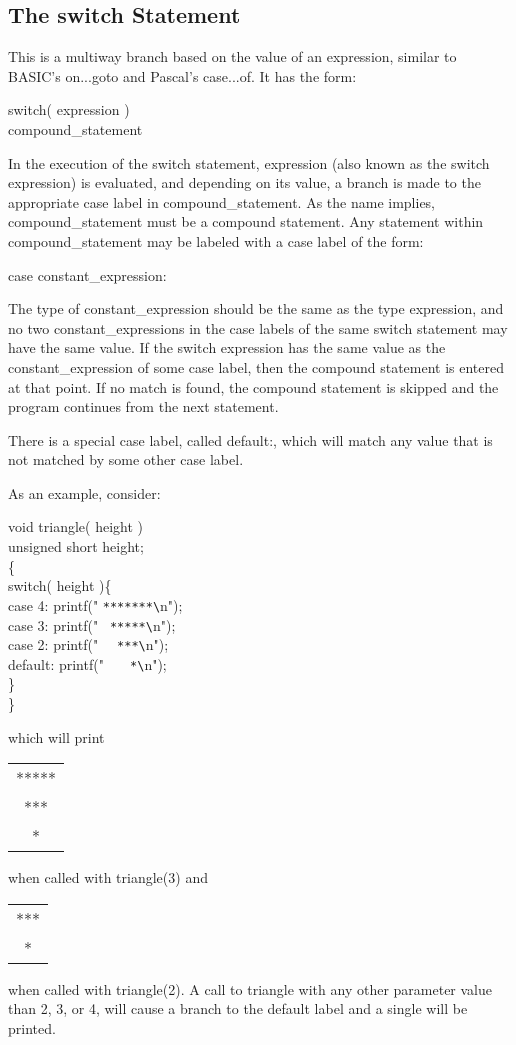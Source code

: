 \subsection{The {\cd switch} Statement}
     This is a multiway branch based on the value of an expression,
similar to BASIC's {\cd on...goto} and Pascal's {\cd case...of}. It
has the form:
\begin{code}
switch( {\ms expression\/} ) \\
 \> {\ms compound\_statement\/}
\end{code}
\noindent
  In the execution of the {\cd switch} statement, {\ms expression\/} 
(also known as the switch expression) is evaluated,  and depending 
on its value, a branch is made to the appropriate {\kc case label\/}
in {\ms compound\_statement\/}. As the name implies, {\ms
compound\_statement\/} must be a compound statement. Any statement
within {\ms compound\_statement\/} may  be labeled  with a  case
label of the form:  
 \begin{code} 
case  {\ms constant\_expression\/}:  
\end{code} 
\noindent
     The type  of {\ms constant\_expression\/} should be the same as
the type {\ms expression\/}, and no two {\ms constant\_expression\/}s
in the case labels of the same {\cd switch} statement may have  the
same value. If the switch expression has the same  value as the
{\ms constant\_expression\/} of  some case label, then  the compound
statement  is entered at that point. If no match is
found, the compound statement is skipped and the program
continues from the next statement.

     There is  a special  case label,  called {\cd default:},  which
will  match any value that is not matched by some other case label.

     As an example, consider:
\begin{code}
 void triangle( height ) \\
 \> unsigned short height; \\
 \{ \+ \\
    switch( height )\{ \+\\
         case 4:   printf(" \verb+*******\+n"); \\
         case 3:   printf(" \verb+ *****\+n"); \\
         case 2:   printf(" \verb+  ***\+n"); \\
         default:  printf(" \verb+   *\+n"); 
			\-\\
    \} \-\\
 \} 
\end{code}
\noindent
which will print
{\cd\begin{tabular}[t]{c}*****\\{***}\\{*}\end{tabular}}
when called with {\cd triangle(3)} and 
{\cd\begin{tabular}[t]{c}***\\{*}\end{tabular}}
when called with {\cd triangle(2)}.  A call to {\cd triangle} with
any other parameter value than 2, 3, or 4, will cause a branch to
the {\cd default} label and a single {\cd *} will be printed.

